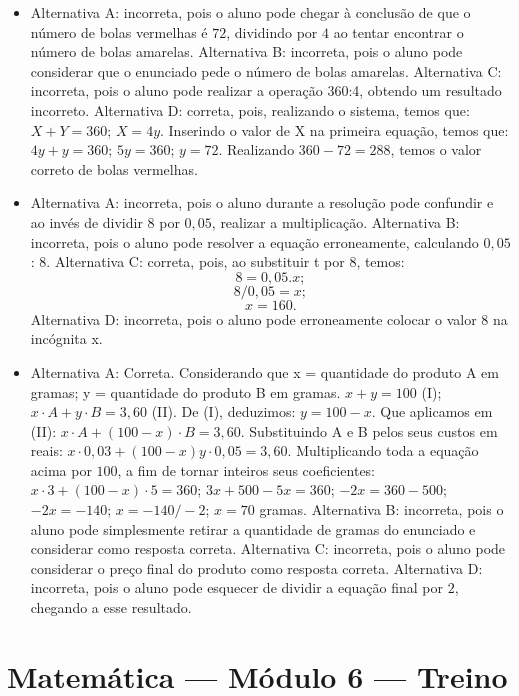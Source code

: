 \begin{itemize}
\item Alternativa A: incorreta, pois o aluno pode chegar à conclusão de que o
número de bolas vermelhas é $72$, dividindo por $4$ ao tentar encontrar o
número de bolas amarelas.
Alternativa B: incorreta, pois o aluno pode considerar que o enunciado
pede o número de bolas amarelas.
Alternativa C: incorreta, pois o aluno pode realizar a operação $360$:4,
obtendo um resultado incorreto.
Alternativa D: correta, pois, realizando o sistema, temos que: $X + Y = 360$; $X = 4y$. Inserindo o valor de X na primeira equação, temos que: $4y + y = 360$; $5y = 360$; $y = 72$. Realizando $360 - 72 = 288$, temos o valor correto de bolas vermelhas.

\item Alternativa A: incorreta, pois o aluno durante a resolução pode
confundir e ao invés de dividir $8$ por $0,05$, realizar a multiplicação.
Alternativa B: incorreta, pois o aluno pode resolver a equação
erroneamente, calculando $0,05$ : $8$.
Alternativa C: correta, pois, ao substituir t por $8$, temos: 
$$8 = 0,05 . x;$$ 
$$8/0,05 = x;$$ 
$$x = 160.$$
Alternativa D: incorreta, pois o aluno pode erroneamente colocar o valor
8 na incógnita x.

\item Alternativa A: Correta. Considerando que x = quantidade do produto A em gramas; y = quantidade do produto B em gramas. $x + y = 100$ (I); $x·A + y·B = 3,60$ (II). De (I), deduzimos: $y = 100 - x$. Que aplicamos em (II): $x·A + (100-x)·B = 3,60$. Substituindo A e B pelos seus custos em reais: $x·0,03 + (100-x)y·0,05 = 3,60$. Multiplicando toda a equação acima por $100$, a fim de tornar inteiros
seus coeficientes: $x·3 + (100-x)·5 = 360$; $3x + 500 - 5x = 360$; $-2x = 360 - 500$; $-2x = -140$; $x = -140/-2$; $x = 70$ gramas. 
Alternativa B: incorreta, pois o aluno pode simplesmente retirar a
quantidade de gramas do enunciado e considerar como resposta correta.
Alternativa C: incorreta, pois o aluno pode considerar o preço final do
produto como resposta correta.
Alternativa D: incorreta, pois o aluno pode esquecer de dividir a
equação final por $2$, chegando a esse resultado.
\end{itemize}

\section*{Matemática — Módulo 6 — Treino}

